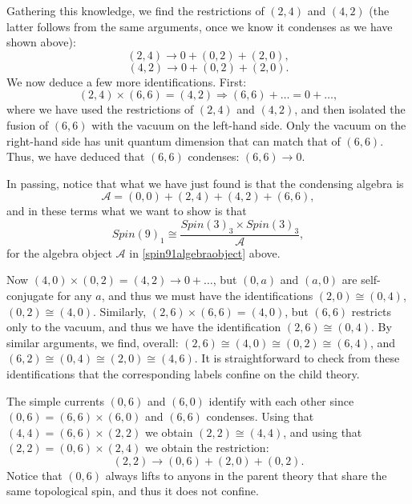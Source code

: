 \documentclass[11pt]{article}
\numberwithin{equation}{section}
\begin{document}
Gathering this knowledge, we find the restrictions of $(2,4)$ and $(4,2)$ (the latter follows from the same arguments, once we know it condenses as we have shown above):
\begin{equation}
    (2,4) \longrightarrow 0 + (0,2) + (2,0),
\end{equation}
\begin{equation}
    (4,2) \longrightarrow 0 + (0,2) + (2,0).
\end{equation}
We now deduce a few more identifications. First:
\begin{equation}
    (2,4) \times (6,6) = (4,2) \Longrightarrow (6,6) + \ldots = 0 + \ldots,
\end{equation}
where we have used the restrictions of $(2,4)$ and $(4,2)$, and then isolated the fusion of $(6,6)$ with the vacuum on the left-hand side. Only the vacuum on the right-hand side has unit quantum dimension that can match that of $(6,6)$. Thus, we have deduced that $(6,6)$ condenses: $(6,6) \to 0$.  

In passing, notice that what we have just found is that the condensing algebra is
\begin{equation} \label{spin91algebraobject}
    \mathcal{A} = (0,0) + (2,4) + (4,2) + (6,6),
\end{equation}
and in these terms what we want to show is that
\begin{equation}
    Spin(9)_{1} \cong \frac{Spin(3)_{3} \times Spin(3)_{3}}{\mathcal{A}},
\end{equation}
for the algebra object $\mathcal{A}$ in \eqref{spin91algebraobject} above.

Now $(4,0) \times (0,2) = (4,2) \to 0 + \ldots$, but $(0,a)$ and $(a,0)$ are self-conjugate for any $a$, and thus we must have the identifications $(2,0) \cong (0,4)$, $(0,2) \cong (4,0)$. Similarly, $(2,6) \times (6,6) = (4,0)$, but $(6,6)$ restricts only to the vacuum, and thus we have the identification $(2,6) \cong (0,4)$. By similar arguments, we find, overall: $(2,6) \cong (4,0) \cong (0,2) \cong (6,4)$, and $(6,2) \cong (0,4) \cong (2,0) \cong (4,6)$. It is straightforward to check from these identifications that the corresponding labels confine on the child theory.

The simple currents $(0,6)$ and $(6,0)$ identify with each other since $(0,6) = (6,6) \times (6,0)$ and $(6,6)$ condenses. Using that $(4,4) = (6,6) \times (2,2)$ we obtain $(2,2) \cong (4,4)$, and using that $(2,2) = (0,6) \times (2,4)$ we obtain the restriction:
\begin{equation}
    (2,2) \longrightarrow (0,6) + (2,0) + (0,2).
\end{equation}
Notice that $(0,6)$ always lifts to anyons in the parent theory that share the same topological spin, and thus it does not confine.
\end{document}
